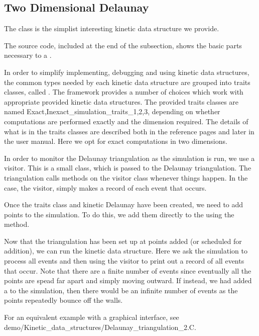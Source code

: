 

\subsection{Two Dimensional Delaunay}
\label{sec:delaunay_2_example}

The  class is the simplist
interesting kinetic data structure we provide. 

The source code, included at the end of the subsection, shows the
basic parts necessary to a .

In order to simplify implementing, debugging and using kinetic data
structures, the common types needed by each kinetic data structure are
grouped into traits classes, called . The
framework provides a number of choices which work with appropriate
provided kinetic data structures. The provided traits classes are
named {Exact,Inexact}\_simulation\_traits\_{1,2,3}, depending on
whether computations are performed exactly and the dimension
required. The details of what is in the traits classes are described
both in the
 reference pages and later in the user manual. Here we opt for exact computations in two dimensions.

In order to monitor the Delaunay triangulation as the simulation is
run, we use a visitor. This is a small class, which is passed to the
Delaunay triangulation. The triangulation calls methods on the visitor
class whenever things happen. In the case, the visitor,
 simply makes a record of each event that occurs.

Once the traits class and kinetic Delaunay have been created, we need
to add points to the simulation. To do this, we add them directly to
the
 using the  method. 


Now that the triangulation has been set up at points added (or
scheduled for addition), we can run the kinetic data structure. Here
we ask the simulation to process all events and then using the visitor
to print out a record of all events that occur. Note that there are a
finite number of events since eventually all the points are spead far
apart and simply moving outward. If instead, we had added a
 to the simulation, then 
there would be an infinite number of events as the points repeatedly
bounce off the walls.

For an equivalent example with a graphical interface, see
demo/Kinetic\_data\_structures/Delaunay\_triangulation\_2.C.

\label{fig:delaunay_2_usage_program}
